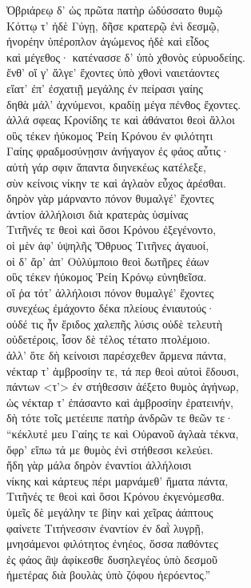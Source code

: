 \begin{pages}
\begin{Leftside}
\quad{}Ὀβριάρεῳ δ' ὡς πρῶτα πατὴρ ὠδύσσατο θυμῷ \\
Κόττῳ τ' ἠδὲ Γύγῃ, δῆσε κρατερῷ ἐνὶ δεσμῷ, \\
ἠνορέην ὑπέροπλον ἀγώμενος ἠδὲ καὶ εἶδος\\
καὶ μέγεθος· κατένασσε δ' ὑπὸ χθονὸς εὐρυοδείης.  \\
ἔνθ' οἵ γ' ἄλγε' ἔχοντες ὑπὸ χθονὶ ναιετάοντες\\
εἵατ' ἐπ' ἐσχατιῇ μεγάλης ἐν πείρασι γαίης \\
δηθὰ μάλ' ἀχνύμενοι, κραδίῃ μέγα πένθος ἔχοντες.\\
ἀλλά σφεας Κρονίδης τε καὶ ἀθάνατοι θεοὶ ἄλλοι \\
οὓς τέκεν ἠύκομος Ῥείη Κρόνου ἐν φιλότητι  \\
Γαίης φραδμοσύνῃσιν ἀνήγαγον ἐς φάος αὖτις· \\
αὐτὴ γάρ σφιν ἅπαντα διηνεκέως κατέλεξε, \\
σὺν κείνοις νίκην τε καὶ ἀγλαὸν εὖχος ἀρέσθαι.\\
δηρὸν γὰρ μάρναντο πόνον θυμαλγέ' ἔχοντες\\
ἀντίον ἀλλήλοισι διὰ κρατερὰς ὑσμίνας   \\
Τιτῆνές τε θεοὶ καὶ ὅσοι Κρόνου ἐξεγένοντο, \\
οἱ μὲν ἀφ' ὑψηλῆς Ὄθρυος Τιτῆνες ἀγαυοί,  \\
οἱ δ' ἄρ' ἀπ' Οὐλύμποιο θεοὶ δωτῆρες ἐάων \\
οὓς τέκεν ἠύκομος Ῥείη Κρόνῳ εὐνηθεῖσα.\\
οἵ ῥα τότ' ἀλλήλοισι πόνον θυμαλγέ' ἔχοντες  \\
συνεχέως ἐμάχοντο δέκα πλείους ἐνιαυτούς· \\
οὐδέ τις ἦν ἔριδος χαλεπῆς λύσις οὐδὲ τελευτὴ\\
οὐδετέροις, ἶσον δὲ τέλος τέτατο πτολέμοιο.\\

\quad{}ἀλλ' ὅτε δὴ κείνοισι παρέσχεθεν ἄρμενα πάντα,\\
νέκταρ τ' ἀμβροσίην τε, τά περ θεοὶ αὐτοὶ ἔδουσι, \\
πάντων \textless{}τ'\textgreater{} ἐν στήθεσσιν ἀέξετο θυμὸς ἀγήνωρ,\\
ὡς νέκταρ τ' ἐπάσαντο καὶ ἀμβροσίην ἐρατεινήν,\\
δὴ τότε τοῖς μετέειπε πατὴρ ἀνδρῶν τε θεῶν τε·\\
``κέκλυτέ μευ Γαίης τε καὶ Οὐρανοῦ ἀγλαὰ τέκνα, \\
ὄφρ' εἴπω τά με θυμὸς ἐνὶ στήθεσσι κελεύει.  \\
ἤδη γὰρ μάλα δηρὸν ἐναντίοι ἀλλήλοισι\\
νίκης καὶ κάρτευς πέρι μαρνάμεθ' ἤματα πάντα, \\
Τιτῆνές τε θεοὶ καὶ ὅσοι Κρόνου ἐκγενόμεσθα.\\
ὑμεῖς δὲ μεγάλην τε βίην καὶ χεῖρας ἀάπτους\\
φαίνετε Τιτήνεσσιν ἐναντίον ἐν δαῒ λυγρῇ, \\
μνησάμενοι φιλότητος ἐνηέος, ὅσσα παθόντες\\
ἐς φάος ἂψ ἀφίκεσθε δυσηλεγέος ὑπὸ δεσμοῦ\\
ἡμετέρας διὰ βουλὰς ὑπὸ ζόφου ἠερόεντος.''\\


\end{Leftside}
\end{pages}
